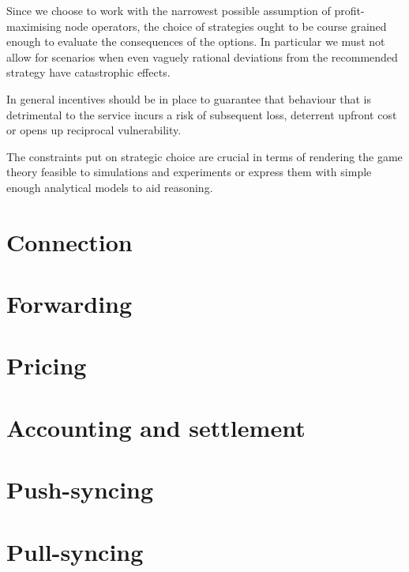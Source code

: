 Since we choose to work with the narrowest possible assumption of profit-maximising node operators, the choice of strategies ought to be course grained enough to evaluate the consequences of the options. In particular we must not allow for scenarios when even vaguely rational deviations from the recommended strategy have catastrophic effects.

In general incentives should be in place to guarantee that behaviour that is detrimental to the service incurs a risk of subsequent loss, deterrent upfront cost or opens up reciprocal  vulnerability. 

The constraints put on strategic choice are crucial in terms of rendering the game theory feasible to simulations and experiments or express them with simple enough analytical models to aid reasoning. 

\section{Connection  \statusorange}\label{spec:strategy:connection}


\section{Forwarding  \statusorange}\label{spec:strategy:forwarding}


\section{Pricing  \statusorange}\label{spec:strategy:pricing}


\section{Accounting and settlement  \statusorange}\label{spec:strategy:swap}


\section{Push-syncing  \statusorange}\label{spec:strategy:push-sync}


\section{Pull-syncing  \statusorange}\label{spec:strategy:pull-sync}


